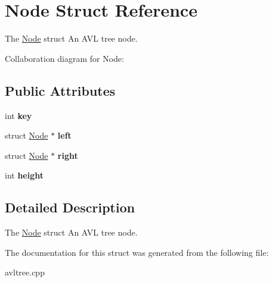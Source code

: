 \hypertarget{structNode}{}\section{Node Struct Reference}
\label{structNode}


The \hyperlink{structNode}{Node} struct An A\+VL tree node.  




Collaboration diagram for Node\+:
\subsection*{Public Attributes}
\begin{DoxyCompactItemize}
\item 
int {\bfseries key}\hypertarget{structNode_a3020957813f200a9da836428aad2d8d7}{}\label{structNode_a3020957813f200a9da836428aad2d8d7}

\item 
struct \hyperlink{structNode}{Node} $\ast$ {\bfseries left}\hypertarget{structNode_ad0976834843c7618677d22a10c495b36}{}\label{structNode_ad0976834843c7618677d22a10c495b36}

\item 
struct \hyperlink{structNode}{Node} $\ast$ {\bfseries right}\hypertarget{structNode_af99e7102380da88d7c079fa264230cf4}{}\label{structNode_af99e7102380da88d7c079fa264230cf4}

\item 
int {\bfseries height}\hypertarget{structNode_a61966b207f0584aaa4773e5e1266e905}{}\label{structNode_a61966b207f0584aaa4773e5e1266e905}

\end{DoxyCompactItemize}


\subsection{Detailed Description}
The \hyperlink{structNode}{Node} struct An A\+VL tree node. 

The documentation for this struct was generated from the following file\+:\begin{DoxyCompactItemize}
\item 
avltree.\+cpp\end{DoxyCompactItemize}
